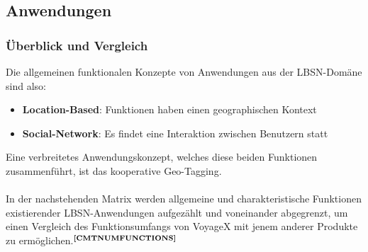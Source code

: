 \newpage
\subsection{Anwendungen}\label{3_ANW}


\subsubsection{Überblick und Vergleich}\label{3_UEBER}
Die allgemeinen funktionalen Konzepte von Anwendungen aus der LBSN-Domäne sind also:
\begin{itemize}[leftmargin=*,noitemsep,topsep=1ex,parsep=0pt,partopsep=0pt]
\item \textbf{Location-Based}: Funktionen haben einen geographischen Kontext
\item \textbf{Social-Network}: Es findet eine Interaktion zwischen Benutzern statt
\end{itemize}
Eine verbreitetes Anwendungskonzept, welches diese beiden Funktionen zusammenführt, ist das kooperative Geo-Tagging.\\ \\
In der nachstehenden Matrix werden allgemeine und charakteristische Funktionen existierender LBSN-Anwendungen aufgezählt und voneinander abgegrenzt, um einen Vergleich des Funktionsumfangs von VoyageX mit jenem anderer Produkte zu ermöglichen.$^{\textbf{\ref{CMTNUMFUNCTIONS}}}$%
\addtocounter{footnote}{1}%
